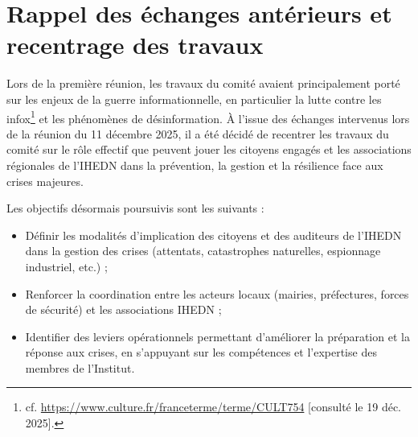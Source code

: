 \documentclass[12pt,a4paper]{article}
\begin{document}

\section{Rappel des échanges antérieurs et recentrage des travaux}

Lors de la première réunion, les travaux du comité avaient principalement porté sur les enjeux de la guerre informationnelle, en particulier la lutte contre les infox\footnote{cf. \url{https://www.culture.fr/franceterme/terme/CULT754} [consulté le 19 déc. 2025].} et les phénomènes de désinformation.  
À l'issue des échanges intervenus lors de la réunion du 11 décembre 2025, il a été décidé de recentrer les travaux du comité sur le rôle effectif que peuvent jouer les citoyens engagés et les associations régionales de l'IHEDN dans la prévention, la gestion et la résilience face aux crises majeures.

Les objectifs désormais poursuivis sont les suivants :

\begin{itemize}
    \item Définir les modalités d'implication des citoyens et des auditeurs de l'IHEDN dans la gestion des crises (attentats, catastrophes naturelles, espionnage industriel, etc.) ;
    \item Renforcer la coordination entre les acteurs locaux (mairies, préfectures, forces de sécurité) et les associations IHEDN ;
    \item Identifier des leviers opérationnels permettant d'améliorer la préparation et la réponse aux crises, en s'appuyant sur les compétences et l'expertise des membres de l'Institut.
\end{itemize}
\end{document}

